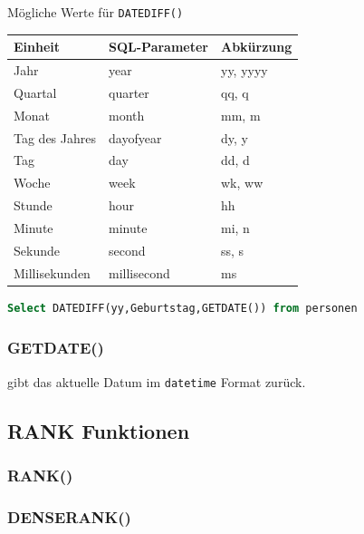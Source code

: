 \documentclass[12pt,ngerman,a4paper,index=totoc,twoside]{scrartcl}
\newcommand{\sql}[1]{\texttt{#1}}
\newcommand{\lwidth}{0.75}
\begin{document}
\begin{center}
\captionsetup{type=table}
\caption{Mögliche Werte für \sql{DATEDIFF()}}
\begin{tabular}{lll} \toprule \label{aaa}
Einheit & SQL-Parameter & Abkürzung \\ \midrule
Jahr & year&	yy, yyyy \\
Quartal &	quarter & qq, q \\
Monat	& month &mm, m \\
Tag des Jahres & dayofyear &	dy, y \\
Tag	& day &dd, d \\
Woche &	week& wk, ww \\
Stunde &	hour & hh \\
Minute & minute& mi, n \\
Sekunde &	second & ss, s \\
Millisekunden &	millisecond & ms \\ \bottomrule
\end{tabular}
\end{center}

\begin{center}
\begin{minipage}{\lwidth\textwidth}
\begin{lstlisting}[language={SQL},caption={Beispiel \sql{DATEDIFF}},label={funktionen:datediff2}]
Select DATEDIFF(yy,Geburtstag,GETDATE()) from personen 
\end{lstlisting}
\end{minipage}
\end{center}

\subsubsection{GETDATE()}

gibt das aktuelle Datum im \sql{datetime} Format zurück.

\subsection{RANK Funktionen}


\subsubsection{RANK()}

\subsubsection{DENSE\textunderscore RANK()} 
\end{document}
